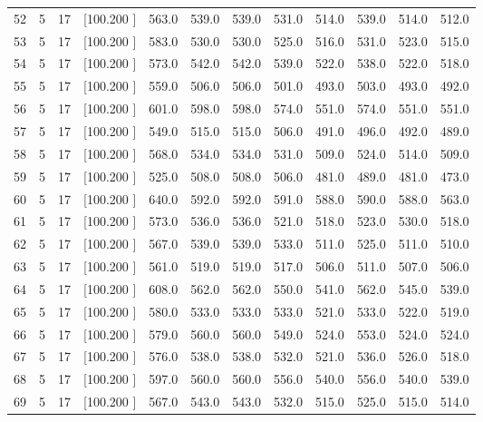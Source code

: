 \documentclass[12pt,a4paper]{article}
\begin{document}
\begin{center}
{\begin{tabular}{r r r r r r r r r r r r}
  52&  5& 17&[100.200   ]&   563.0&   539.0&   539.0&   531.0&   514.0&   539.0&   514.0&   512.0\\[-0.02in]
  53&  5& 17&[100.200   ]&   583.0&   530.0&   530.0&   525.0&   516.0&   531.0&   523.0&   515.0\\[-0.02in]
  54&  5& 17&[100.200   ]&   573.0&   542.0&   542.0&   539.0&   522.0&   538.0&   522.0&   518.0\\[-0.02in]
  55&  5& 17&[100.200   ]&   559.0&   506.0&   506.0&   501.0&   493.0&   503.0&   493.0&   492.0\\[-0.02in]
  56&  5& 17&[100.200   ]&   601.0&   598.0&   598.0&   574.0&   551.0&   574.0&   551.0&   551.0\\[-0.02in]
  57&  5& 17&[100.200   ]&   549.0&   515.0&   515.0&   506.0&   491.0&   496.0&   492.0&   489.0\\[-0.02in]
  58&  5& 17&[100.200   ]&   568.0&   534.0&   534.0&   531.0&   509.0&   524.0&   514.0&   509.0\\[-0.02in]
  59&  5& 17&[100.200   ]&   525.0&   508.0&   508.0&   506.0&   481.0&   489.0&   481.0&   473.0\\[-0.02in]
  60&  5& 17&[100.200   ]&   640.0&   592.0&   592.0&   591.0&   588.0&   590.0&   588.0&   563.0\\[-0.02in]
  61&  5& 17&[100.200   ]&   573.0&   536.0&   536.0&   521.0&   518.0&   523.0&   530.0&   518.0\\[-0.02in]
  62&  5& 17&[100.200   ]&   567.0&   539.0&   539.0&   533.0&   511.0&   525.0&   511.0&   510.0\\[-0.02in]
  63&  5& 17&[100.200   ]&   561.0&   519.0&   519.0&   517.0&   506.0&   511.0&   507.0&   506.0\\[-0.02in]
  64&  5& 17&[100.200   ]&   608.0&   562.0&   562.0&   550.0&   541.0&   562.0&   545.0&   539.0\\[-0.02in]
  65&  5& 17&[100.200   ]&   580.0&   533.0&   533.0&   533.0&   521.0&   533.0&   522.0&   519.0\\[-0.02in]
  66&  5& 17&[100.200   ]&   579.0&   560.0&   560.0&   549.0&   524.0&   553.0&   524.0&   524.0\\[-0.02in]
  67&  5& 17&[100.200   ]&   576.0&   538.0&   538.0&   532.0&   521.0&   536.0&   526.0&   518.0\\[-0.02in]
  68&  5& 17&[100.200   ]&   597.0&   560.0&   560.0&   556.0&   540.0&   556.0&   540.0&   539.0\\[-0.02in]
  69&  5& 17&[100.200   ]&   567.0&   543.0&   543.0&   532.0&   515.0&   525.0&   515.0&   514.0\\[-0.02in]

\end{tabular}}
\end{center}
\end{document}
